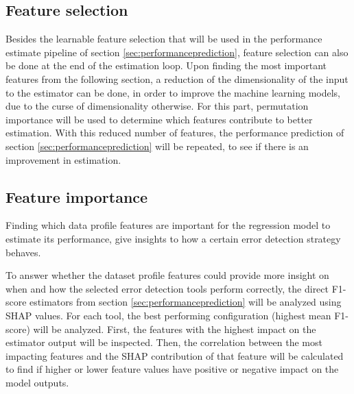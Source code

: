 \subsection{Feature selection}
\label{subsec:featureselection}
Besides the learnable feature selection that will be used in the performance estimate pipeline of section \ref{sec:performanceprediction}, feature selection can also be done at the end of the estimation loop. Upon finding the most important features from the following section, a reduction of the dimensionality of the input to the estimator can be done, in order to improve the machine learning models, due to the curse of dimensionality otherwise. For this part, permutation importance will be used to determine which features contribute to better estimation. With this reduced number of features, the performance prediction of section \ref{sec:performanceprediction} will be repeated, to see if there is an improvement in estimation.

\subsection{Feature importance}
Finding which data profile features are important for the regression model to estimate its performance, give insights to how a certain error detection strategy behaves.

To answer whether the dataset profile features could provide more insight on when and how the selected error detection tools perform correctly, the direct F1-score estimators from section \ref{sec:performanceprediction} will be analyzed using SHAP values. For each tool, the best performing configuration (highest mean F1-score) will be analyzed. First, the features with the highest impact on the estimator output will be inspected. Then, the correlation between the most impacting features and the SHAP contribution of that feature will be calculated to find if higher or lower feature values have positive or negative impact on the model outputs.